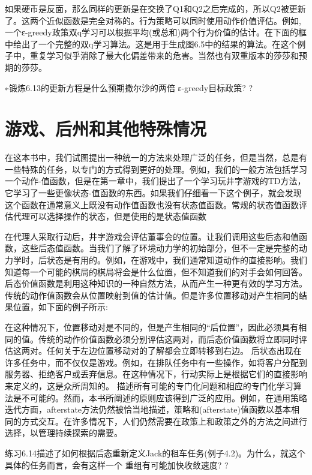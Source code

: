 如果硬币是反面，那么同样的更新是在交换了Q1和Q2之后完成的，所以Q2被更新了。这两个近似函数是完全对称的。行为策略可以同时使用动作价值评估。例如,一个ε-greedy政策双q学习可以根据平均(或总和)两个行为价值的估计。在下面的框中给出了一个完整的双q学习算法。这是用于生成图6.5中的结果的算法。在这个例子中，重复学习似乎消除了最大化偏差带来的危害。当然也有双重版本的莎莎和预期的莎莎。
 
∗锻炼6.13的更新方程是什么预期撒尔沙的两倍
ε-greedy目标政策? 					?



\section{游戏、后州和其他特殊情况}

在这本书中，我们试图提出一种统一的方法来处理广泛的任务，但是当然，总是有一些特殊的任务，以专门的方式得到更好的处理。例如，我们的一般方法包括学习一个动作-值函数，但是在第一章中，我们提出了一个学习玩井字游戏的TD方法，它学习了一些更像状态-值函数的东西。如果我们仔细看一下这个例子，就会发现这个函数在通常意义上既没有动作值函数也没有状态值函数。常规的状态值函数评估代理可以选择操作的状态，但是使用的是状态值函数

在代理人采取行动后，井字游戏会评估董事会的位置。让我们调用这些后态和值函数，这些后态值函数。当我们了解了环境动力学的初始部分，但不一定是完整的动力学时，后状态是有用的。例如，在游戏中，我们通常知道动作的直接影响。我们知道每一个可能的棋局的棋局将会是什么位置，但不知道我们的对手会如何回答。后态价值函数是利用这种知识的一种自然方法，从而产生一种更有效的学习方法。
传统的动作值函数会从位置映射到值的估计值。但是许多位置移动对产生相同的结果位置，如下面的例子所示:
 
 

在这种情况下，位置移动对是不同的，但是产生相同的“后位置”，因此必须具有相同的值。传统的动作价值函数必须分别评估这两对，而后态价值函数将立即同时评估这两对。任何关于左边位置移动对的了解都会立即转移到右边。
后状态出现在许多任务中，而不仅仅是游戏。例如，在排队任务中有一些操作，如将客户分配到服务器、拒绝客户或丢弃信息。在这种情况下，行动实际上是根据它们的直接影响来定义的，这是众所周知的。
描述所有可能的专门化问题和相应的专门化学习算法是不可能的。然而，本书所阐述的原则应该得到广泛的应用。例如，在通用策略迭代方面，afterstate方法仍然被恰当地描述，策略和(afterstate)值函数以基本相同的方式交互。在许多情况下，人们仍然需要在政策上和政策之外的方法之间进行选择，以管理持续探索的需要。

练习6.14描述了如何根据后态重新定义Jack的租车任务(例子4.2)。为什么，就这个具体的任务而言，会有这样一个
重组有可能加快收敛速度? 					?


